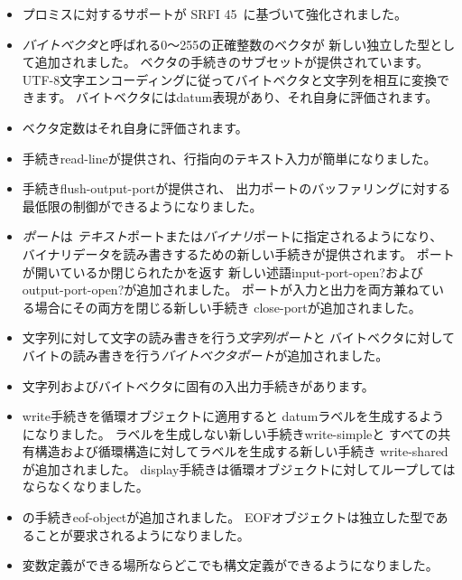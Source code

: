 \begin{itemize}
\item プロミスに対するサポートが
SRFI 45~\cite{srfi45}に基づいて強化されました。

\item {\em バイトベクタ}と呼ばれる0〜255の正確整数のベクタが
新しい独立した型として追加されました。
ベクタの手続きのサブセットが提供されています。
UTF-8文字エンコーディングに従ってバイトベクタと文字列を相互に変換できます。
バイトベクタにはdatum表現があり、それ自身に評価されます。

\item ベクタ定数はそれ自身に評価されます。

\item 手続き{\cf read-line}が提供され、行指向のテキスト入力が簡単になりました。

\item 手続き{\cf flush-output-port}が提供され、
出力ポートのバッファリングに対する最低限の制御ができるようになりました。

\item {\em ポート}は
{\em テキスト}ポートまたは{\em バイナリ}ポートに指定されるようになり、
バイナリデータを読み書きするための新しい手続きが提供されます。
ポートが開いているか閉じられたかを返す
新しい述語{\cf input-port-open?}および{\cf output-port-open?}が追加されました。
ポートが入力と出力を両方兼ねている場合にその両方を閉じる新しい手続き
{\cf close-port}が追加されました。

\item 文字列に対して文字の読み書きを行う{\em 文字列ポート}と
バイトベクタに対してバイトの読み書きを行う{\em バイトベクタポート}が追加されました。

\item 文字列およびバイトベクタに固有の入出力手続きがあります。

\item {\cf write}手続きを循環オブジェクトに適用すると
datumラベルを生成するようになりました。
ラベルを生成しない新しい手続き{\cf write-simple}と
すべての共有構造および循環構造に対してラベルを生成する新しい手続き
{\cf write-shared}が追加されました。
{\cf display}手続きは循環オブジェクトに対してループしてはならなくなりました。

\item \rsixrs{}の手続き{\cf eof-object}が追加されました。
EOFオブジェクトは独立した型であることが要求されるようになりました。

\item 変数定義ができる場所ならどこでも構文定義ができるようになりました。


\end{itemize}
